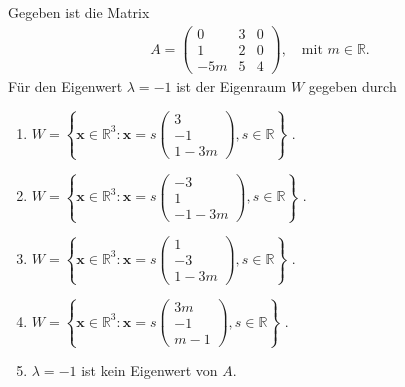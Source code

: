 \subsection*{}
Gegeben ist die Matrix
\begin{align*}
	A =
	\begin{pmatrix}
		0 & 3 & 0 \\
		1 & 2 & 0 \\
		-5m & 5 & 4
	\end{pmatrix}
	, 
	\quad 
	\textrm{mit } m \in \mathbb{R}.
\end{align*}
Für den Eigenwert $ \lambda = -1 $ ist der Eigenraum $ W $ gegeben durch
\renewcommand{\labelenumi}{(\alph{enumi})}
\begin{enumerate}
	\item 
	$ W
	=
	\left\{
	\textbf{x} \in \mathbb{R}^3
	:
	\textbf{x}
	=
	s 
	\begin{pmatrix}
		3 \\ -1 \\ 1 - 3m
	\end{pmatrix},
	s \in \mathbb{R}
	\right\}
	 $
	.
	\item 
	$ W
	=
	\left\{
	\textbf{x} \in \mathbb{R}^3
	:
	\textbf{x}
	=
	s	 
	\begin{pmatrix}
		-3 \\ 1 \\ -1 - 3m
	\end{pmatrix},
	s \in \mathbb{R}
	\right\}
	$
	.
	\item
	$ W
	=
	\left\{
	\textbf{x} \in \mathbb{R}^3
	:
	\textbf{x}
	=
	s	 
	\begin{pmatrix}
		1 \\ -3 \\ 1 - 3m
	\end{pmatrix},
	s \in \mathbb{R}
	\right\}
	$
	.
	\item
	$ W
	=
	\left\{
	\textbf{x} \in \mathbb{R}^3
	:
	\textbf{x}
	=
	s	 
	\begin{pmatrix}
		3m \\ -1 \\ m-1
	\end{pmatrix},
	s \in \mathbb{R}
	\right\}
	$
	.
	\item
	$ \lambda = -1 $ ist kein Eigenwert von $ A $.
\end{enumerate}
\ \\
